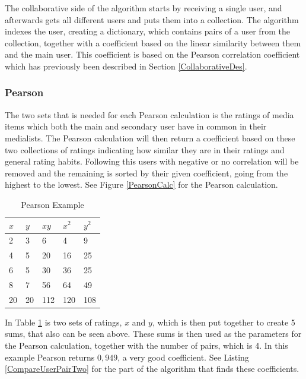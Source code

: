The collaborative side of the algorithm starts by receiving a single user, and afterwards gets all different users and puts them into a collection. The algorithm indexes the user, creating a dictionary, which contains pairs of a user from the collection, together with a coefficient based on the linear similarity between them and the main user. This coefficient is based on the Pearson correlation coefficient which has previously been described in Section \ref{CollaborativeDes}.

\subsubsection{Pearson}

The two sets that is needed for each Pearson calculation is the ratings of media items which both the main and secondary user have in common in their medialists. The Pearson calculation will then return a coefficient based on these two collections of ratings indicating how similar they are in their ratings and general rating habits. Following this users with negative or no correlation will be removed and the remaining is sorted by their given coefficient, going from the highest to the lowest. See Figure \ref{PearsonCalc} for the Pearson calculation.

\begin{table}[htb]
\centering
\begin{tabular}{|l|l|l|l|l|} \hline
	\textbf{$x$} & \textbf{$y$} & \textbf{$xy$}
	& \textbf{$x^2$} & \textbf{$y^2$} \\ \hline
	2 & 3 & 6 & 4 & 9 \\ \hline
	4 & 5 & 20 & 16 & 25 \\ \hline
	6 & 5 & 30 & 36 & 25 \\ \hline
	8 & 7 & 56 & 64 & 49 \\ \hline\hline
	20 & 20 & 112 & 120 & 108 \\ \hline
\end{tabular}
\caption{Pearson Example}
\label{PearsonEx}
\end{table} 

In Table \ref{PearsonEx} is two sets of ratings, $x$ and $y$, which is then put together to create 5 sums, that also can be seen above. These sums is then used as the parameters for the Pearson calculation, together with the number of pairs, which is 4. In this example Pearson returns $0,949$, a very good coefficient. See Listing \ref{CompareUserPairTwo} for the part of the algorithm that finds these coefficients.


